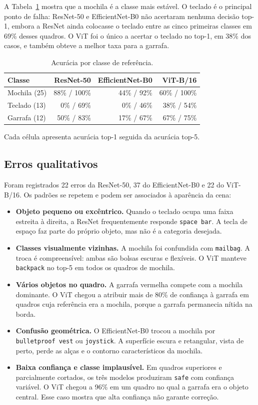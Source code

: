 \documentclass[12pt,a4paper]{article}
\begin{document}
A Tabela~\ref{tab:classes} mostra que a mochila é a classe mais estável. O teclado é
o principal ponto de falha: ResNet-50 e EfficientNet-B0 não acertaram nenhuma decisão
top-1, embora a ResNet ainda colocasse o teclado entre as cinco primeiras classes em
69\% desses quadros. O ViT foi o único a acertar o teclado no top-1, em 38\% dos casos,
e também obteve a melhor taxa para a garrafa.

\begin{table}[H]
\centering
\caption{Acurácia por classe de referência.}
\label{tab:classes}
\begin{tabular}{lrrr}
\toprule
Classe & ResNet-50 & EfficientNet-B0 & ViT-B/16 \\
\midrule
Mochila (25) & 88\% / 100\% & 44\% / 92\% & 60\% / 100\% \\
Teclado (13) & 0\% / 69\% & 0\% / 46\% & 38\% / 54\% \\
Garrafa (12) & 50\% / 83\% & 17\% / 67\% & 67\% / 75\% \\
\bottomrule
\end{tabular}
\end{table}

\noindent Cada célula apresenta acurácia top-1 seguida da acurácia top-5.

\subsection{Erros qualitativos}

Foram registrados 22 erros da ResNet-50, 37 do EfficientNet-B0 e 22 do ViT-B/16.
Os padrões se repetem e podem ser associados à aparência da cena:

\begin{itemize}
    \item \textbf{Objeto pequeno ou excêntrico.} Quando o teclado ocupa uma faixa
    estreita à direita, a ResNet frequentemente responde \texttt{space bar}. A tecla
    de espaço faz parte do próprio objeto, mas não é a categoria desejada.
    \item \textbf{Classes visualmente vizinhas.} A mochila foi confundida com
    \texttt{mailbag}. A troca é compreensível: ambas são bolsas escuras e flexíveis.
    O ViT manteve \texttt{backpack} no top-5 em todos os quadros de mochila.
    \item \textbf{Vários objetos no quadro.} A garrafa vermelha compete com a mochila
    dominante. O ViT chegou a atribuir mais de 80\% de confiança à garrafa em quadros
    cuja referência era a mochila, porque a garrafa permanecia nítida na borda.
    \item \textbf{Confusão geométrica.} O EfficientNet-B0 trocou a mochila por
    \texttt{bulletproof vest} ou \texttt{joystick}. A superfície escura e retangular,
    vista de perto, perde as alças e o contorno característicos da mochila.
    \item \textbf{Baixa confiança e classe implausível.} Em quadros superiores e
    parcialmente cortados, os três modelos produziram \texttt{safe} com confiança
    variável. O ViT chegou a 96\% em um quadro no qual a garrafa era o objeto central.
    Esse caso mostra que alta confiança não garante correção.
\end{itemize}
\end{document}
